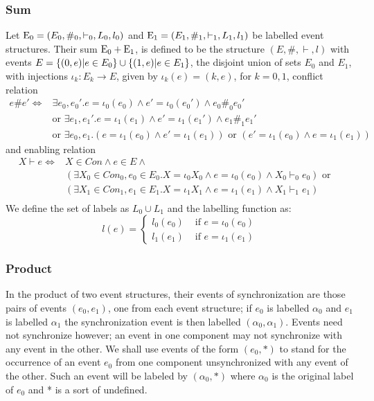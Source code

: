 \subsubsection{Sum}

\begin{definition}
    Let $\mathrm{E_0} = (E_0,\#_0,\vdash_0,L_0,l_0)$ and
    $\mathrm{E_1} = (E_1,\#_1,\vdash_1,L_1,l_1)$ be labelled event structures.
    Their sum $\mathrm{E_0} + \mathrm{E_1}$, is defined to be the structure $(E,\#,\vdash,l)$
    with events $E = \{(0,e)|e \in E_0\} \cup \{(1,e)|e \in E_1\}$,
    the disjoint union of sets $E_0$ and $E_1$,
    with injections $\iota_k: E_k \rightarrow E$, given by
    $\iota_k(e) = (k,e)$, for $k=0,1$, conflict relation
    \begin{align*}
        e \# e' \iff & \exists e_0,e_0'. e = \iota_0(e_0)
        \wedge e' = \iota_0(e_0') \wedge e_0 \#_0e_0'                       \\
                     & \text{or } \exists e_1,e_1'. e = \iota_1(e_1) \wedge
        e' = \iota_1(e_1') \wedge e_1 \#_1 e_1'                             \\
                     & \text{or } \exists e_0,e_1.(e=\iota_1(e_0)
        \wedge e' =\iota_1(e_1)) \text{ or }
        (e'=\iota_1(e_0) \wedge e =\iota_1(e_1))
    \end{align*}
    and enabling relation
    \begin{align*}
        X \vdash e \iff & X \in Con \wedge e \in E \wedge                   & \\
                        & (\exists X_0 \in Con_0,e_0 \in E_0.X = \iota_0X_0
        \wedge e = \iota_0(e_0) \wedge X_0 \vdash_0 e_0) \text{ or }          \\
                        & (\exists X_1 \in Con_1,e_1 \in E_1.X = \iota_1X_1
        \wedge e = \iota_1(e_1) \wedge X_1 \vdash_1 e_1)                      \\
    \end{align*}
    We define the set of labels as $L_0 \cup L_1$ and the labelling function as:
    $$
        l(e) = \begin{cases}
            l_0(e_0) & \text{ if } e = \iota_0(e_0) \\
            l_1(e_1) & \text{ if } e = \iota_1(e_1)
        \end{cases}
    $$
\end{definition}

\subsubsection{Product}
In the product of two event structures, their events of synchronization are those pairs of events $(e_0,e_1)$, one from each event structure;
if $e_0$ is labelled $\alpha_0$ and $e_1$ is labelled $\alpha_1$ the synchronization event is
then labelled $(\alpha_0,\alpha_1)$.
Events need not synchronize however; an event in one component may not synchronize with
any event in the other.
We shall use events of the form $(e_0,*)$ to stand for the occurrence of an event $e_0$
from one component unsynchronized with any event of the other.
Such an event will be labeled by $(\alpha_0,*)$ where $\alpha_0$ is the original label of $e_0$
and * is a sort of undefined.

